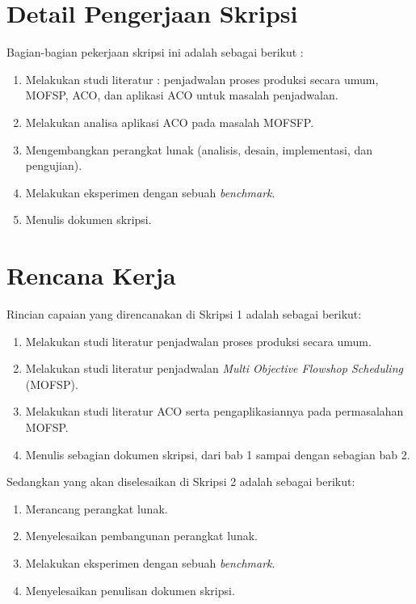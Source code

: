 \documentclass[a4paper,twoside]{article}
\begin{document}
\section{Detail Pengerjaan Skripsi}
Bagian-bagian pekerjaan skripsi ini adalah sebagai berikut :
	\begin{enumerate}
		\item Melakukan studi literatur : penjadwalan proses produksi secara umum, MOFSP, ACO, dan aplikasi ACO untuk masalah penjadwalan.
		\item Melakukan analisa aplikasi ACO pada masalah MOFSFP.
		\item Mengembangkan perangkat lunak (analisis, desain, implementasi, dan pengujian).
		\item Melakukan eksperimen dengan sebuah {\it benchmark}. 
		\item Menulis dokumen skripsi.
	\end{enumerate}

\section{Rencana Kerja}
Rincian capaian yang direncanakan di Skripsi 1 adalah sebagai berikut:
\begin{enumerate}
\item Melakukan studi literatur penjadwalan proses produksi secara umum.
\item Melakukan studi literatur penjadwalan {\it Multi Objective Flowshop Scheduling} (MOFSP).
\item Melakukan studi literatur ACO serta pengaplikasiannya pada permasalahan MOFSP.
\item Menulis sebagian dokumen skripsi, dari bab 1 sampai dengan sebagian bab 2.

\end{enumerate}

Sedangkan yang akan diselesaikan di Skripsi 2 adalah sebagai berikut:
\begin{enumerate}
\item Merancang perangkat lunak.
\item Menyelesaikan pembangunan perangkat lunak.
\item Melakukan eksperimen dengan sebuah {\it benchmark}.
\item Menyelesaikan penulisan dokumen skripsi.

\end{enumerate}
\end{document}
